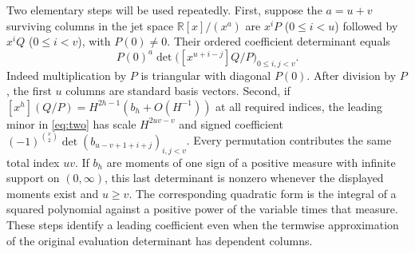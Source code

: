 \documentclass[11pt,a4paper]{article}
\begin{document}
Two elementary steps will be used repeatedly. First, suppose the $a=u+v$ surviving columns in the jet space $\mathbb R[x]/(x^a)$ are $x^iP$ ($0\le i<u$) followed by $x^iQ$ ($0\le i<v$), with $P(0)\ne0$. Their ordered coefficient determinant equals
\begin{equation}\label{eq:two}
 P(0)^a\det\big([x^{u+i-j}]Q/P\big)_{0\le i,j<v}.
\end{equation}
Indeed multiplication by $P$ is triangular with diagonal $P(0)$. After division by $P$, the first $u$ columns are standard basis vectors. Second, if
$[x^h](Q/P)=H^{2h-1}(b_h+O(H^{-1}))$ at all required indices, the leading minor in \eqref{eq:two} has scale $H^{2uv-v}$ and signed coefficient $(-1)^{\binom v2}\det(b_{u-v+1+i+j})_{i,j<v}$. Every permutation contributes the same total index $uv$. If $b_h$ are moments of one sign of a positive measure with infinite support on $(0,\infty)$, this last determinant is nonzero whenever the displayed moments exist and $u\ge v$. The corresponding quadratic form is the integral of a squared polynomial against a positive power of the variable times that measure. These steps identify a leading coefficient even when the termwise approximation of the original evaluation determinant has dependent columns.
\end{document}
